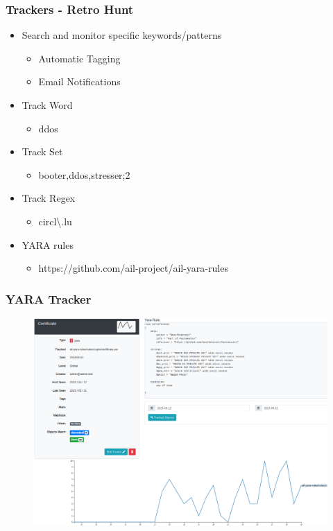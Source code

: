 \documentclass[10pt,aspectratio=169, colorlinks=true, linkcolor=circlBlue]{beamer}
\begin{document}
\begin{frame}
    \frametitle{Trackers - Retro Hunt}
        \begin{itemize}
        	\item Search and monitor specific keywords/patterns
        	\begin{itemize}
            	\item Automatic Tagging
            	\item Email Notifications
            \end{itemize}
            \item Track Word
            \begin{itemize}
            	\item ddos
            \end{itemize}
            \item Track Set
            \begin{itemize}
            	\item booter,ddos,stresser;2
            \end{itemize}
            \item Track Regex
            \begin{itemize}
            	\item circl\textbackslash.lu
            \end{itemize}
            \item YARA rules
            	\begin{itemize}
            	\item https://github.com/ail-project/ail-yara-rules
            \end{itemize}
        \end{itemize}
\end{frame}

\begin{frame}
    \frametitle{YARA Tracker}
        \begin{figure}
            \includegraphics[scale=0.22]{screenshot/tracker_yara.png}
        \end{figure}
\end{frame}
\end{document}
